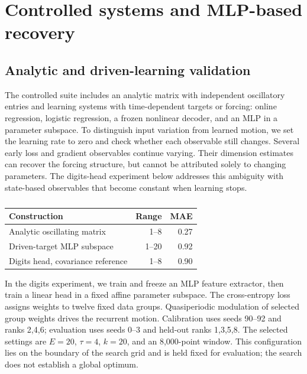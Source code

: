 {\section{Controlled systems and MLP-based recovery}\label{app:controlled}
\subsection{Analytic and driven-learning validation}
The controlled suite includes an analytic matrix with independent oscillatory entries and learning systems with time-dependent targets or forcing: online regression, logistic regression, a frozen nonlinear decoder, and an MLP in a parameter subspace. To distinguish input variation from learned motion, we set the learning rate to zero and check whether each observable still changes. Several early loss and gradient observables continue varying. Their dimension estimates can recover the forcing structure, but cannot be attributed solely to changing parameters. The digits-head experiment below addresses this ambiguity with state-based observables that become constant when learning stops.

\begin{table}[h]
\centering\small
\caption{}
\begin{tabular}{lrr}
\toprule
Construction & Range & MAE \\
\midrule
Analytic oscillating matrix & 1--8 & 0.27 \\
Driven-target MLP subspace & 1--20 & 0.92 \\
Digits head, covariance reference & 1--8 & 0.90 \\
\bottomrule
\end{tabular}
\end{table}

In the digits experiment, we train and freeze an MLP feature extractor, then train a linear head in a fixed affine parameter subspace. The cross-entropy loss assigns weights to twelve fixed data groups. Quasiperiodic modulation of selected group weights drives the recurrent motion. Calibration uses seeds 90--92 and ranks 2,4,6; evaluation uses seeds 0--3 and held-out ranks 1,3,5,8. The selected settings are $E=20$, $\tau=4$, $k=20$, and an 8,000-point window. This configuration lies on the boundary of the search grid and is held fixed for evaluation; the search does not establish a global optimum.

}
